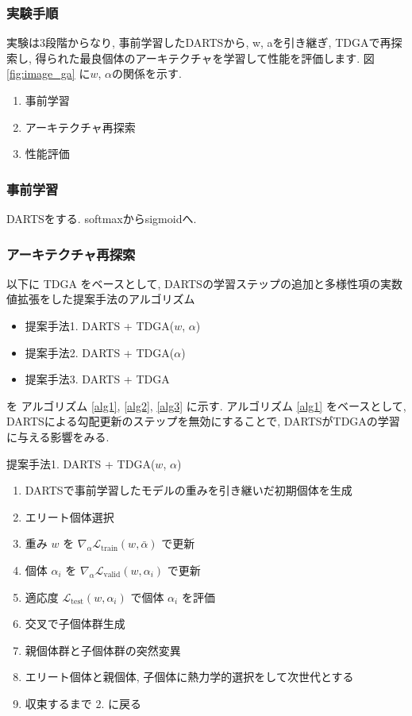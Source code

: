 \subsubsection{実験手順}
実験は3段階からなり, 事前学習したDARTSから, w, aを引き継ぎ, TDGAで再探索し, 得られた最良個体のアーキテクチャを学習して性能を評価します.
図 \ref{fig:image_ga} に$w$, $\alpha$の関係を示す.

\begin{enumerate}
  \item 事前学習
  \item アーキテクチャ再探索
  \item 性能評価
\end{enumerate}

\subsubsection{事前学習}
DARTSをする.
softmaxからsigmoidへ.


\subsubsection{アーキテクチャ再探索}

以下に TDGA をベースとして, DARTSの学習ステップの追加と多様性項の実数値拡張をした提案手法のアルゴリズム

\begin{itemize}
  \item 提案手法1. DARTS + TDGA($w$, $\alpha$)
  \item 提案手法2. DARTS + TDGA($\alpha$)
  \item 提案手法3. DARTS + TDGA
\end{itemize}

\noindent
を アルゴリズム \ref{alg1}, \ref{alg2}, \ref{alg3} に示す.
アルゴリズム \ref{alg1} をベースとして, DARTSによる勾配更新のステップを無効にすることで,
DARTSがTDGAの学習に与える影響をみる.

\begin{algorithm}
  \caption{提案手法1. DARTS + TDGA($w$, $\alpha$)}
  \label{alg1}
  \begin{enumerate}
    \item DARTSで事前学習したモデルの重みを引き継いだ初期個体を生成
    \item エリート個体選択
    \item 重み $w$ を $\displaystyle \nabla_\alpha \mathcal{L}_{\mathrm{train}}(w, \bar{\alpha})$ で更新
    \item 個体 $\alpha_i$ を $\displaystyle \nabla_\alpha \mathcal{L}_{\mathrm{valid}}(w, \alpha_i)$ で更新
    \item 適応度 $\displaystyle \mathcal{L}_{\mathrm{test}}(w, \alpha_i)$ で個体 $\alpha_i$ を評価
    \item 交叉で子個体群生成
    \item 親個体群と子個体群の突然変異
    \item エリート個体と親個体, 子個体に熱力学的選択をして次世代とする
    \item 収束するまで 2. に戻る
  \end{enumerate}
\end{algorithm}


